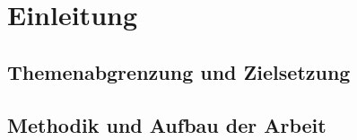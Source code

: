 \section{Einleitung}

\subsection{Themenabgrenzung und Zielsetzung}
\subsection{Methodik und Aufbau der Arbeit}



\newpage